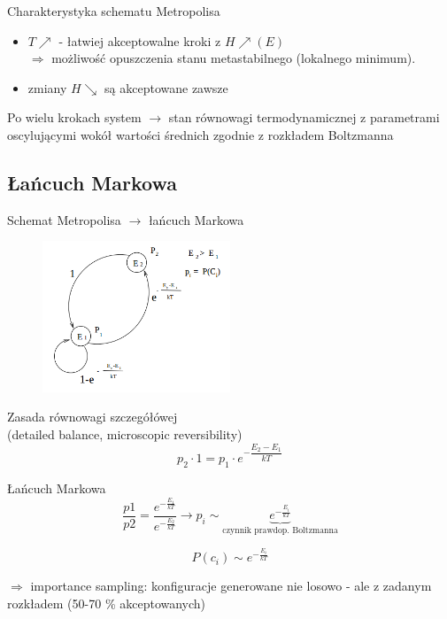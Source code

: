 	
	\begin{frame}{Charakterystyka schematu Metropolisa}
		\begin{itemize}
			\item $T \nearrow$ - łatwiej akceptowalne kroki z $H \nearrow (E)$ \\ $ \Rightarrow$ możliwość opuszczenia stanu metastabilnego (lokalnego minimum).
			\item zmiany $H \searrow$ są akceptowane zawsze
		\end{itemize}
		
		Po wielu krokach system $\rightarrow$ stan równowagi termodynamicznej z parametrami oscylującymi wokół wartości średnich zgodnie z rozkładem Boltzmanna
	\end{frame}

\subsection{Łańcuch Markowa}
	
	\begin{frame}{Schemat Metropolisa $\rightarrow$ łańcuch Markowa}
		\begin{figure}
				\includegraphics[width=0.5\textwidth]{img/18/markow}
		\end{figure}
		\begin{block}{Zasada równowagi szczegółówej\\ 
		(detailed balance, microscopic reversibility)}
			$$
			p_2 \cdot 1 = p_1 \cdot e^{- \dfrac{E_2 - E_1}{kT}}
			$$
		\end{block}
	\end{frame}

	\begin{frame}{Łańcuch Markowa}
		$$
	 	\frac{p1}{p2} = \dfrac{e^{-\frac{E_1}{kT}}}{e^{-\frac{E_2}{kT}}} \rightarrow p_i \sim \underbrace{e^{-\frac{E_i}{kT}}}_{\text{czynnik prawdop. Boltzmanna}}
		$$		
		
		$$
		P(c_i) \sim e^{-\frac{E_i}{kT}}
		$$
		
		$\Rightarrow$ importance sampling: konfiguracje generowane nie losowo - ale z zadanym rozkładem (50-70 \% akceptowanych)
		
		
	\end{frame}
	
